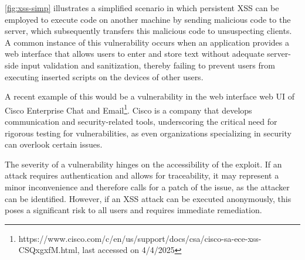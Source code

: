 \autoref{fig:xss-simp} illustrates a simplified scenario in which persistent XSS can be employed to execute code on another machine by sending malicious code to the server, which subsequently transfers this malicious code to unsuspecting clients. A common instance of this vulnerability occurs when an application provides a web interface that allows users to enter and store text without adequate server-side input validation and sanitization, thereby failing to prevent users from executing inserted scripts on the devices of other users.

A recent example of this would be a vulnerability in the web interface web UI of Cisco Enterprise Chat and 
Email\footnote{https://www.cisco.com/c/en/us/support/docs/csa/cisco-sa-ece-xss-CSQxgxfM.html, last accessed on 4/4/2025}. 
Cisco is a company that develops communication and security-related tools, 
underscoring the critical need for rigorous testing for vulnerabilities,
as even organizations specializing in security can overlook certain issues.

The severity of a vulnerability hinges on the accessibility of the exploit. 
If an attack requires authentication and allows for traceability,
it may represent a minor inconvenience and therefore calls for a patch of the issue,
as the attacker can be identified. However, if an XSS attack can be executed anonymously,
this poses a significant risk to all users and requires immediate remediation.


